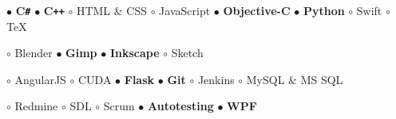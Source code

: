 \documentclass[11pt,a4paper]{article}
\begin{document}
    \smallskip
    $\bullet$ {\bf C\texttt{\#}}
    \hspace{0.34cm}
    $\bullet$ {\bf C\texttt{++}}
    \hspace{0.34cm}
    $\circ$ HTML \& CSS
    \hspace{0.34cm}
    $\circ$ JavaScript
    \hspace{0.34cm}
    $\bullet$ {\bf Objective-C}
    \hspace{0.34cm}
    $\bullet$ {\bf Python}
    \hspace{0.34cm}
    $\circ$ Swift
    \hspace{0.34cm}
    $\circ$ TeX


    \smallskip


    \smallskip
    $\circ$ Blender
    \hspace{0.34cm}
    $\bullet$ {\bf Gimp}
    \hspace{0.34cm}
    $\bullet$ {\bf Inkscape}
    \hspace{0.34cm}
    $\circ$ Sketch


    \smallskip


    \smallskip
    $\circ$ AngularJS
    \hspace{0.34cm}
    $\circ$ CUDA
    \hspace{0.34cm}
    $\bullet$ {\bf Flask}
    \hspace{0.34cm}
    $\bullet$ {\bf Git}
    \hspace{0.34cm}
    $\circ$ Jenkins
    \hspace{0.34cm}
    $\circ$ MySQL \& MS SQL

    \vspace{0.04cm}
    $\circ$ Redmine
    \hspace{0.34cm}
    $\circ$ SDL
    \hspace{0.34cm}
    $\circ$ Scrum
    \hspace{0.34cm}
    $\bullet$ {\bf Autotesting}
    \hspace{0.34cm}
    $\bullet$ {\bf WPF}

\end{document}
